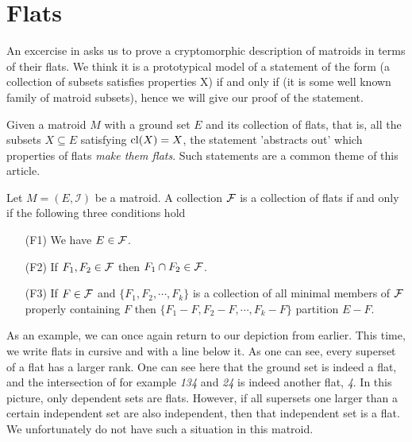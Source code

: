 \newpage

\section{Flats}

An excercise in \cite[35]{oxley1} asks us to prove a cryptomorphic description of matroids in terms of their flats. We think it is a prototypical model of a statement of the form (a collection of subsets satisfies properties X) if and only if (it is some well known family of matroid subsets), hence we will give our proof of the statement.

    Given a matroid $M$ with a ground set $E$ and its collection of flats, that is, all the subsets $X \subseteq E$ satisfying $\mathrm{cl}(X) = X$, the statement 'abstracts out' which properties of flats \textit{make them flats}. Such statements are a common theme of this article.

\begin{theorem}
    Let $M = (E, \mathcal{I})$ be a matroid. A collection $\mathcal{F}$ is a collection of flats if and only if the following three conditions hold

    \begin{enumerate}
        \item[(F1)] We have $E \in \mathcal{F}$.
        \item[(F2)] If $F_1, F_2 \in \mathcal{F}$ then $F_1 \cap F_2 \in \mathcal{F}$.
        \item[(F3)] If $F \in \mathcal{F}$ and $\{F_1, F_2, \cdots, F_k\}$ is a collection of all minimal members of $\mathcal{F}$ properly containing $F$ then $\{F_1-F, F_2-F, \cdots, F_k - F\}$ partition $E-F$.
        
    \end{enumerate}
        
\end{theorem}

As an example, we can once again return to our depiction from earlier. This time, we write flats in cursive and with a line below it. As one can see, every superset of a flat has a larger rank. One can see here that the ground set is indeed a flat, and the intersection of for example \textit{134} and \textit{24} is indeed another flat, \textit{4}. In this picture, only dependent sets are flats. However, if all supersets one larger than a certain independent set are also independent, then that independent set is a flat. We unfortunately do not have such a situation in this matroid. 

